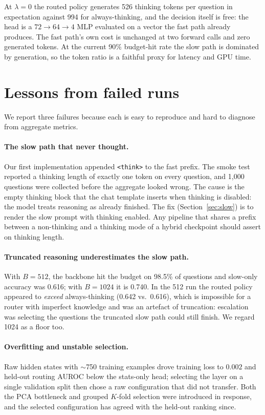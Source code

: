\documentclass{article}
\begin{document}
At $\lambda=0$ the routed policy generates 526 thinking tokens per question in expectation against 994 for always-thinking, and the decision itself is free: the head is a $72\to64\to4$ MLP evaluated on a vector the fast path already produces. The fast path's own cost is unchanged at two forward calls and zero generated tokens. At the current 90\% budget-hit rate the slow path is dominated by generation, so the token ratio is a faithful proxy for latency and GPU time.

\section{Lessons from failed runs}
\label{sec:lessons}

We report three failures because each is easy to reproduce and hard to diagnose from aggregate metrics.

\paragraph{The slow path that never thought.}
Our first implementation appended \texttt{<think>} to the fast prefix. The smoke test reported a thinking length of exactly one token on every question, and 1{,}000 questions were collected before the aggregate looked wrong. The cause is the empty thinking block that the chat template inserts when thinking is disabled: the model treats reasoning as already finished. The fix (Section~\ref{sec:slow}) is to render the slow prompt with thinking enabled. Any pipeline that shares a prefix between a non-thinking and a thinking mode of a hybrid checkpoint should assert on thinking length.

\paragraph{Truncated reasoning underestimates the slow path.}
With $B=512$, the backbone hit the budget on 98.5\% of questions and slow-only accuracy was 0.616; with $B=1024$ it is 0.740. In the 512 run the routed policy appeared to \emph{exceed} always-thinking (0.642 vs.\ 0.616), which is impossible for a router with imperfect knowledge and was an artefact of truncation: escalation was selecting the questions the truncated slow path could still finish. We regard 1024 as a floor too.

\paragraph{Overfitting and unstable selection.}
Raw hidden states with $\sim$750 training examples drove training loss to $0.002$ and held-out routing AUROC below the stats-only head; selecting the layer on a single validation split then chose a raw configuration that did not transfer. Both the PCA bottleneck and grouped $K$-fold selection were introduced in response, and the selected configuration has agreed with the held-out ranking since.
\end{document}
